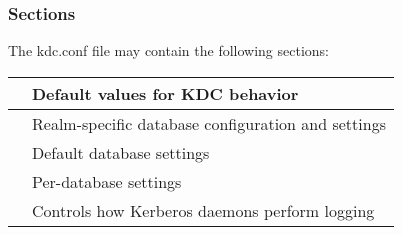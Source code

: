 \documentclass[letterpaper,10pt,english]{sphinxmanual}
\begin{document}
\subsubsection{Sections}
\label{\detokenize{admin/conf_files/kdc_conf:sections}}
The kdc.conf file may contain the following sections:


\begin{savenotes}\sphinxattablestart
\centering
\begin{tabulary}{\linewidth}[t]{|T|T|}
\hline

{\hyperref[\detokenize{admin/conf_files/kdc_conf:kdcdefaults}]{}}
&
Default values for KDC behavior
\\
\hline
{\hyperref[\detokenize{admin/conf_files/kdc_conf:kdc-realms}]{}}
&
Realm-specific database configuration and settings
\\
\hline
{\hyperref[\detokenize{admin/conf_files/kdc_conf:dbdefaults}]{}}
&
Default database settings
\\
\hline
{\hyperref[\detokenize{admin/conf_files/kdc_conf:dbmodules}]{}}
&
Per-database settings
\\
\hline
{\hyperref[\detokenize{admin/conf_files/kdc_conf:logging}]{}}
&
Controls how Kerberos daemons perform logging
\\
\hline
\end{tabulary}
\par
\sphinxattableend\end{savenotes}
\end{document}
